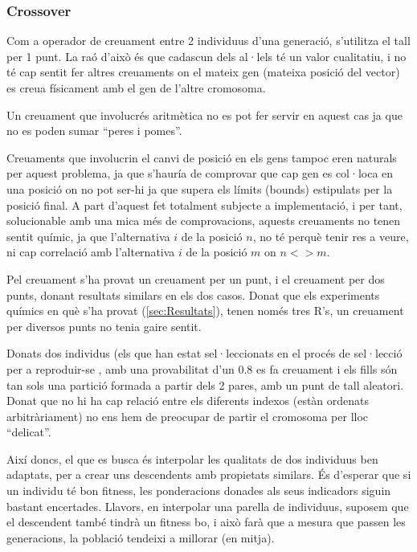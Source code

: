 \documentclass[titlepage,a4paper,12pt]{book}
\begin{document}

\subsubsection{Crossover} %
\label{ssub:Crossover}

Com a operador de creuament entre 2 individuus d'una generació, s'utilitza el
tall per 1 punt.  La raó d'això és que cadascun dels al·lels té un valor
cualitatiu, i no té cap sentit fer altres creuaments on el mateix gen (mateixa
posició del vector) es creua físicament amb el gen de l'altre cromosoma.

Un creuament que involucrés aritmètica no es pot fer servir en aquest cas ja que
no es poden sumar ``peres i pomes''.

Creuaments que involucrin el canvi de posició en els gens tampoc eren naturals
per aquest problema, ja que s'hauría de comprovar que cap gen es col·loca en una
posició on no pot ser-hi ja que supera els límits (bounds) estipulats per la
posició final.  A part d'aquest fet totalment subjecte a implementació, i per
tant, solucionable amb una mica més de comprovacions, aquests creuaments no
tenen sentit químic, ja que l'alternativa $i$ de la posició $n$, no té perquè
tenir res a veure, ni cap correlació amb l'alternativa $i$ de la posició $m$ on
$n <> m$.


Pel creuament s'ha provat un creuament per un punt, i el creuament per dos
punts, donant resultats similars en els dos casos.  Donat que els experiments
químics en què s'ha provat (\ref{sec:Resultats}), tenen només tres R's, un
creuament per diversos punts no tenia gaire sentit.

Donats dos individus (els que han estat sel·leccionats en el procés de
sel·lecció per a reproduir-se , amb una provabilitat d'un 0.8 es fa creuament i
els fills són tan sols una partició formada a partir dels 2 pares, amb un punt
de tall aleatori.  Donat que no hi ha cap relació entre els diferents indexos
(estàn ordenats arbitràriament) no ens hem de preocupar de partir el cromosoma
per lloc ``delicat''. 

Així doncs, el que es busca és interpolar les qualitats de dos individuus ben
adaptats, per a crear uns descendents amb propietats similars.  És d'esperar que
si un individu té bon fitness, les ponderacions donades als seus indicadors
siguin bastant encertades.  Llavors, en interpolar una parella de individuus,
suposem que el descendent també tindrà un fitness bo, i això farà que a mesura
que passen les generacions, la població tendeixi a millorar (en mitja).
\end{document}
